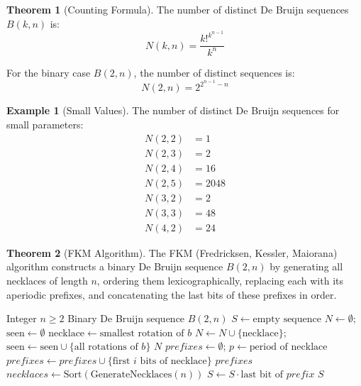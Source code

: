 \documentclass{article}
\theoremstyle{definition}
\newtheorem{example}{Example}
\newtheorem{theorem}{Theorem}
\begin{document}
\begin{theorem}[Counting Formula]
The number of distinct De Bruijn sequences $B(k, n)$ is:
\begin{equation}
    N(k, n) = \frac{k!^{k^{n-1}}}{k^n}
\end{equation}

For the binary case $B(2, n)$, the number of distinct sequences is:
\begin{equation}
    N(2, n) = 2^{2^{n-1}-n}
\end{equation}
\end{theorem}

\begin{example}[Small Values]
The number of distinct De Bruijn sequences for small parameters:
\begin{align}
    N(2, 2) &= 1 \\
    N(2, 3) &= 2 \\
    N(2, 4) &= 16 \\
    N(2, 5) &= 2048 \\
    N(3, 2) &= 2 \\
    N(3, 3) &= 48 \\
    N(4, 2) &= 24
\end{align}
\end{example}
\begin{theorem}[FKM Algorithm]
The FKM (Fredricksen, Kessler, Maiorana) algorithm constructs a binary De Bruijn sequence $B(2, n)$ by generating all necklaces of length $n$, ordering them lexicographically, replacing each with its aperiodic prefixes, and concatenating the last bits of these prefixes in order.
\end{theorem}

\begin{algorithm}
\caption{FKM Algorithm for $B(2, n)$}
\begin{algorithmic}[1]
\Require Integer $n \geq 2$
\Ensure Binary De Bruijn sequence $B(2, n)$
\State $S \gets \text{empty sequence}$
    \State $N \gets \emptyset$; $\text{seen} \gets \emptyset$
            \State $\text{necklace} \gets \text{smallest rotation of } b$
            \State $N \gets N \cup \{\text{necklace}\}$; $\text{seen} \gets \text{seen} \cup \{\text{all rotations of } b\}$
        \EndIf
    \EndFor
    \State \Return $N$
\EndFunction
{}
    \State $prefixes \gets \emptyset$; $p \gets \text{period of necklace}$
        \State $prefixes \gets prefixes \cup \{\text{first } i \text{ bits of necklace}\}$
    \EndFor
    \State \Return $prefixes$
\EndFunction
\State $necklaces \gets \text{Sort}(\text{GenerateNecklaces}(n))$
        \State $S \gets S \cdot \text{last bit of } prefix$
    \EndFor
\EndFor
\State \Return $S$
\end{algorithmic}
\end{algorithm}
\end{document}
